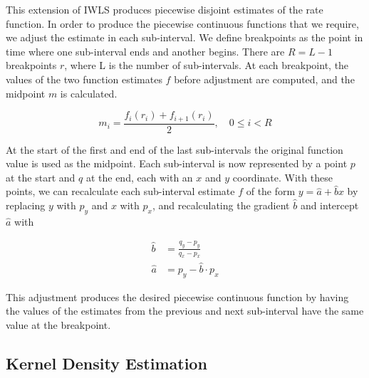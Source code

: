 \documentclass[11pt]{article}
\begin{document}
    This extension of IWLS produces piecewise disjoint estimates of the rate
    function. In order to produce the piecewise continuous functions that we
    require, we adjust the estimate in each sub-interval. We define breakpoints
    as the point in time where one sub-interval ends and another begins. There
    are $R=L-1$ breakpoints $r$, where L is the number of sub-intervals. At each
    breakpoint, the values of the two function estimates $f$ before adjustment
    are computed, and the midpoint $m$ is calculated.

    \begin{equation} 
    m_i = \frac{f_{i}(r_i) + f_{i+1}(r_i)}{2},\quad 0\leq i < R
    \end{equation}

    At the start of the first and end of the last sub-intervals the original
    function value is used as the midpoint. Each sub-interval is now represented
    by a point $p$ at the start and $q$ at the end, each with an $x$ and $y$
    coordinate. With these points, we can recalculate each sub-interval estimate
    $f$ of the form $y=\hat{a}+\hat{b}x$ by replacing $y$ with $p_y$ and $x$
    with $p_x$, and recalculating the gradient $\hat{b}$ and intercept $\hat{a}$
    with

    \begin{align} 
    \hat{b} &= \frac{q_y-p_y}{q_x-p_x}\\
    \hat{a} &= p_y - \hat{b}\cdot p_x 
    \end{align}

    This adjustment produces the desired piecewise continuous function by having
    the values of the estimates from the previous and next sub-interval have the
    same value at the breakpoint.
\subsection{Kernel Density Estimation}
\label{sec-4.2}
\end{document}
